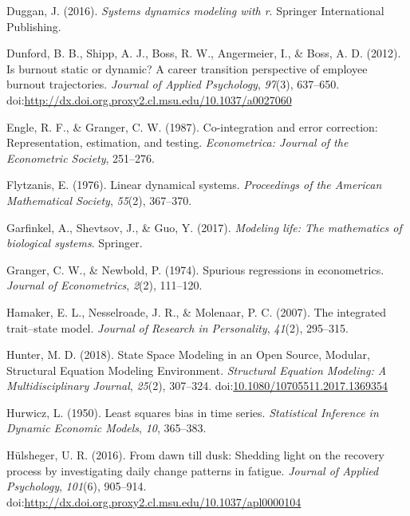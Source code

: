 \documentclass[english,,man]{apa6}
\begin{document}
\leavevmode\hypertarget{ref-duggan_systems}{}%
Duggan, J. (2016). \emph{Systems dynamics modeling with r}. Springer International Publishing.

\leavevmode\hypertarget{ref-dunford_is_2012}{}%
Dunford, B. B., Shipp, A. J., Boss, R. W., Angermeier, I., \& Boss, A. D. (2012). Is burnout static or dynamic? A career transition perspective of employee burnout trajectories. \emph{Journal of Applied Psychology}, \emph{97}(3), 637--650. doi:\href{https://doi.org/http://dx.doi.org.proxy2.cl.msu.edu/10.1037/a0027060}{http://dx.doi.org.proxy2.cl.msu.edu/10.1037/a0027060}

\leavevmode\hypertarget{ref-engle_co-integration_1987}{}%
Engle, R. F., \& Granger, C. W. (1987). Co-integration and error correction: Representation, estimation, and testing. \emph{Econometrica: Journal of the Econometric Society}, 251--276.

\leavevmode\hypertarget{ref-flytzanis1976linear}{}%
Flytzanis, E. (1976). Linear dynamical systems. \emph{Proceedings of the American Mathematical Society}, \emph{55}(2), 367--370.

\leavevmode\hypertarget{ref-garfinkel2017modeling}{}%
Garfinkel, A., Shevtsov, J., \& Guo, Y. (2017). \emph{Modeling life: The mathematics of biological systems}. Springer.

\leavevmode\hypertarget{ref-granger_spurious_1974}{}%
Granger, C. W., \& Newbold, P. (1974). Spurious regressions in econometrics. \emph{Journal of Econometrics}, \emph{2}(2), 111--120.

\leavevmode\hypertarget{ref-hamaker2007integrated}{}%
Hamaker, E. L., Nesselroade, J. R., \& Molenaar, P. C. (2007). The integrated trait--state model. \emph{Journal of Research in Personality}, \emph{41}(2), 295--315.

\leavevmode\hypertarget{ref-hunter_state_2018}{}%
Hunter, M. D. (2018). State Space Modeling in an Open Source, Modular, Structural Equation Modeling Environment. \emph{Structural Equation Modeling: A Multidisciplinary Journal}, \emph{25}(2), 307--324. doi:\href{https://doi.org/10.1080/10705511.2017.1369354}{10.1080/10705511.2017.1369354}

\leavevmode\hypertarget{ref-hurwicz1950least}{}%
Hurwicz, L. (1950). Least squares bias in time series. \emph{Statistical Inference in Dynamic Economic Models}, \emph{10}, 365--383.

\leavevmode\hypertarget{ref-hulsheger_dawn_2016}{}%
Hülsheger, U. R. (2016). From dawn till dusk: Shedding light on the recovery process by investigating daily change patterns in fatigue. \emph{Journal of Applied Psychology}, \emph{101}(6), 905--914. doi:\href{https://doi.org/http://dx.doi.org.proxy2.cl.msu.edu/10.1037/apl0000104}{http://dx.doi.org.proxy2.cl.msu.edu/10.1037/apl0000104}
\end{document}
